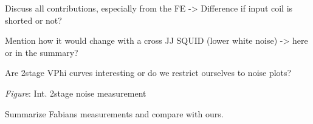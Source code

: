 Discuss all contributions, especially from the FE -> Difference if input coil is shorted or not?

Mention how it would change with a cross JJ SQUID (lower white noise) -> here or in the summary?

Are 2stage VPhi curves interesting or do we restrict ourselves to noise plots?


\textit{Figure}: Int. 2stage noise measurement

Summarize Fabians measurements and compare with ours. 